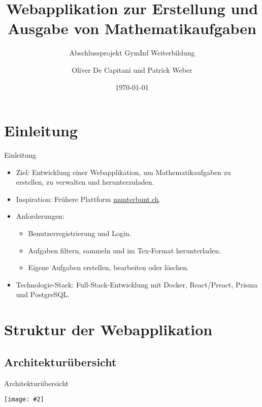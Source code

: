 \documentclass{beamer}
\title{Webapplikation zur Erstellung und Ausgabe von Mathematikaufgaben}
\subtitle{Abschlussprojekt GymInf Weiterbildung}
\author{Oliver De Capitani und Patrick Weber}
\date{\today}
\newcommand{\centfig}[2]{\begin{center}
  \texttt{[image: \#2]}
  \end{center}}
\begin{document}
\frame{\titlepage}


\section{Einleitung}
\begin{frame}{Einleitung}
    \begin{itemize}
        \item<1-> Ziel: Entwicklung einer Webapplikation, um Mathematikaufgaben zu erstellen, zu verwalten und herunterzuladen.
        \item<2-> Inspiration: Frühere Plattform \url{munterbunt.ch}.
        \item<3-> Anforderungen:
        \begin{itemize}
            \item Benutzerregistrierung und Login.
            \item Aufgaben filtern, sammeln und im Tex-Format herunterladen.
            \item Eigene Aufgaben erstellen, bearbeiten oder löschen.
        \end{itemize}
        \item<4-> Technologie-Stack: Full-Stack-Entwicklung mit Docker, React/Preact, Prisma und PostgreSQL.
    \end{itemize}
\end{frame}

\section{Struktur der Webapplikation}
\subsection{Architekturübersicht}
\begin{frame}{Architekturübersicht}
    \centfig{0.7}{docker-container.png}
\end{frame}
\end{document}

